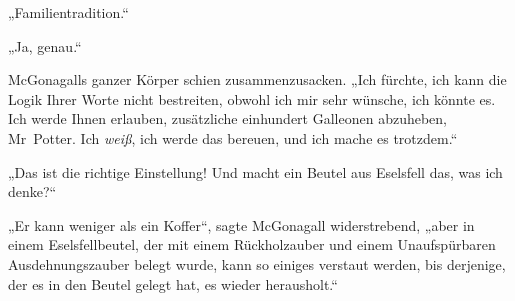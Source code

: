 „Familientradition.“

„Ja, genau.“

McGonagalls ganzer Körper schien zusammenzusacken. „Ich fürchte, ich kann die Logik Ihrer Worte nicht bestreiten, obwohl ich mir sehr wünsche, ich könnte es. Ich werde Ihnen erlauben, zusätzliche einhundert Galleonen abzuheben, Mr~Potter. Ich \emph{weiß}, ich werde das bereuen, und ich mache es trotzdem.“

„Das ist die richtige Einstellung! Und macht ein Beutel aus Eselsfell das, was ich denke?“

„Er kann weniger als ein Koffer“, sagte McGonagall widerstrebend, „aber in einem Eselsfellbeutel, der mit einem Rückholzauber und einem Unaufspürbaren Ausdehnungszauber belegt wurde, kann so einiges verstaut werden, bis derjenige, der es in den Beutel gelegt hat, es wieder herausholt.“

